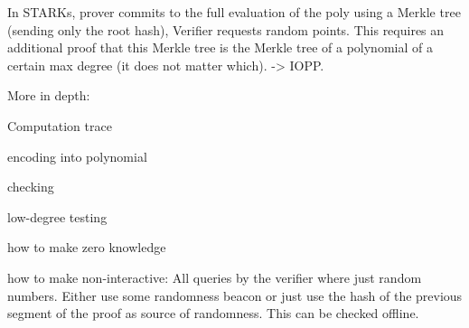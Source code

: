 \documentclass[11pt,letterpaper]{article}
\begin{document}
In STARKs, prover commits to the full evaluation of the poly using a Merkle tree (sending only the root hash),
Verifier requests random points. This requires an additional proof that this Merkle tree is the
Merkle tree of a polynomial of a certain max degree (it does not matter which). -> IOPP.

More in depth:

Computation trace

encoding into polynomial

checking

low-degree testing

how to make zero knowledge

how to make non-interactive:
All queries by the verifier where just random numbers. Either use some randomness beacon
or just use the hash of the previous segment of the proof as source of randomness. This can be checked
offline.
\end{document}

